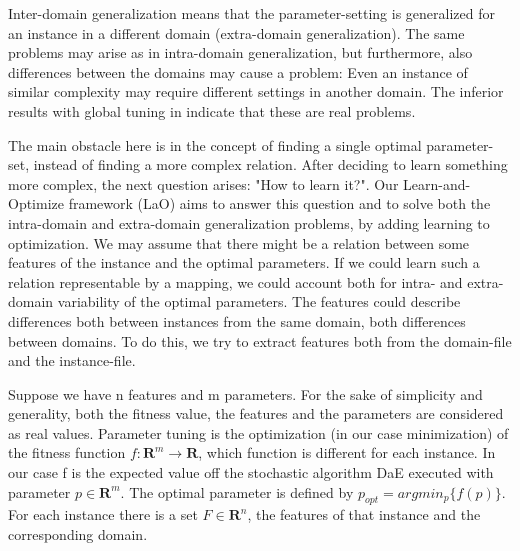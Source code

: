 \documentclass{MYsig-alternate}
\begin{document}
Inter-domain generalization means that the parameter-setting is generalized for an instance in a different domain (extra-domain generalization). The same problems may arise as in intra-domain generalization, but furthermore, also differences between the domains may cause a problem: Even an instance of similar complexity may require different settings in another domain. The inferior results with global tuning in \cite{BibGECCO:2010} indicate that these are real problems.

The main obstacle here is in the concept of finding a single optimal parameter-set, instead of finding a more complex relation. After deciding to learn something more complex, the next question arises: "How to learn it?". Our Learn-and-Optimize framework (LaO) aims to answer this question and to solve both the intra-domain and extra-domain generalization problems, by adding learning to optimization. We may assume that there might be a relation between some features of the instance and the optimal parameters. If we could learn such a relation representable by a mapping, we could account both for intra- and extra-domain variability of the optimal parameters. The features could describe differences both between instances from the same domain, both differences between domains. To do this, we try to extract features both from the domain-file and the instance-file.

Suppose we have n features and m parameters. For the sake of simplicity and generality, both the fitness value, the features and the parameters are considered as real values. Parameter tuning is the optimization (in our case minimization) of the fitness function \begin{math}f:\mathbf{R}^m\to \mathbf{R} \end{math}, which function is different for each instance. In our case f is the expected value off the stochastic algorithm DaE executed with parameter \begin{math} p \in \mathbf{R}^m \end{math}. The optimal parameter is defined by \begin{math} p_{opt}=argmin_p\{f(p)\} \end{math}. For each instance there is a set \begin{math} F \in \mathbf{R}^n \end{math}, the features of that instance and the corresponding domain. 
\end{document}
